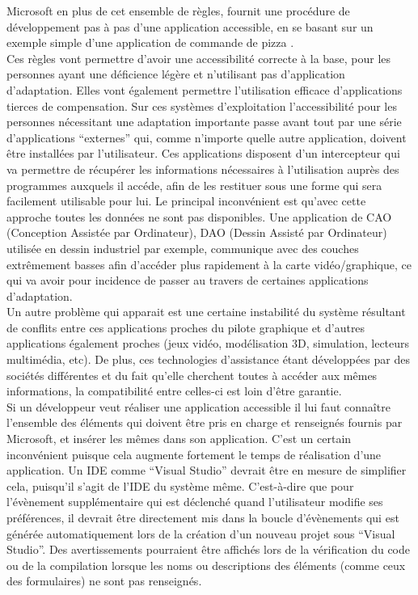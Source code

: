 \documentclass[french,a4paper]{report}
\begin{document}
Microsoft en plus de cet ensemble de règles, fournit une procédure de développement pas à pas
d'une application accessible, en se basant sur un exemple simple d'une application de
commande de pizza \cite{micprocdev}.\\
Ces règles vont permettre d'avoir une accessibilité correcte à la base, pour les personnes ayant
une déficience légère et n'utilisant pas d'application d'adaptation. Elles vont également
permettre l'utilisation efficace d'applications tierces de compensation.
\newline
Sur ces systèmes d'exploitation l'accessibilité pour les personnes nécessitant une adaptation
importante passe avant tout par une série d'applications \enquote{externes} qui, comme n'importe quelle
autre application, doivent être installées par l'utilisateur. Ces applications disposent d'un
intercepteur
qui va permettre de récupérer les informations nécessaires à l'utilisation auprès des programmes
auxquels il accéde, afin de les restituer sous une forme qui sera facilement utilisable pour lui.
Le principal inconvénient est qu'avec cette approche toutes les données ne sont pas disponibles.
Une application de CAO (Conception Assistée par Ordinateur), DAO (Dessin Assisté par Ordinateur)
utilisée en dessin industriel par exemple, communique avec des couches extrêmement basses
afin d'accéder plus rapidement à la carte vidéo/graphique, ce qui va avoir pour incidence de
passer au travers de certaines applications d'adaptation.\\
Un autre problème qui apparait est une certaine instabilité du système résultant de conflits
entre ces applications proches du pilote graphique et d'autres applications également proches (jeux
vidéo, modélisation 3D, simulation, lecteurs multimédia, etc). De plus, ces technologies d'assistance
étant développées par des sociétés différentes et du fait qu'elle cherchent toutes à accéder aux mêmes
informations, la compatibilité entre celles-ci est loin d'être garantie.\\
Si un développeur veut réaliser une application accessible il lui faut connaître l'ensemble des
éléments qui doivent être pris en charge et renseignés fournis par Microsoft, et insérer les
mêmes dans son application.
C'est un certain inconvénient puisque cela augmente fortement le temps de
réalisation d'une application. Un IDE comme \enquote{Visual Studio} devrait être en mesure de simplifier
cela, puisqu'il s'agit de l'IDE du système même. C'est-à-dire que pour l'évènement supplémentaire
qui est déclenché quand l'utilisateur modifie ses préférences, il devrait être directement mis dans la
boucle d'évènements qui est générée automatiquement lors de la création d'un nouveau projet sous
\enquote{Visual Studio}. Des avertissements pourraient être affichés lors de la vérification du
code ou de la compilation lorsque les noms ou descriptions des éléments (comme ceux des
formulaires) ne sont pas renseignés.
\end{document}
